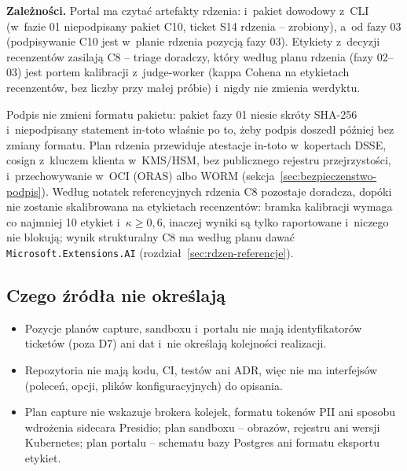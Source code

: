 \textbf{Zależności.} Portal ma czytać artefakty rdzenia:  i~pakiet
dowodowy z~CLI (w~fazie 01 niepodpisany pakiet C10, ticket S14 rdzenia -- zrobiony), a~od
fazy 03  (podpisywanie C10 jest w~planie rdzenia pozycją fazy 03).
Etykiety z~decyzji recenzentów zasilają C8 -- triage doradczy, który według planu rdzenia
(fazy 02--03) jest portem kalibracji z~judge-worker (kappa Cohena na etykietach recenzentów,
bez liczby przy małej próbie) i~nigdy nie zmienia werdyktu.

Podpis nie zmieni formatu pakietu: pakiet fazy 01 niesie skróty SHA-256 i~niepodpisany
statement in-toto właśnie po to, żeby podpis doszedł później bez zmiany formatu. Plan
rdzenia przewiduje atestacje in-toto w~kopertach DSSE, cosign z~kluczem klienta w~KMS/HSM,
bez publicznego rejestru przejrzystości, i~przechowywanie w~OCI (ORAS) albo WORM
(sekcja~\ref{sec:bezpieczenstwo-podpis}). Według notatek referencyjnych rdzenia C8 pozostaje
doradcza, dopóki nie zostanie skalibrowana na etykietach recenzentów: bramka kalibracji
wymaga co najmniej 10 etykiet i~$\kappa \geq 0{,}6$, inaczej wyniki są tylko raportowane
i~niczego nie blokują; wynik strukturalny C8 ma według planu dawać
\texttt{Microsoft.Extensions.AI} (rozdział~\ref{sec:rdzen-referencje}).


\subsection{Czego źródła nie określają}\label{sec:faza02-luki}

\begin{itemize}
  \item Pozycje planów capture, sandboxu i~portalu nie mają identyfikatorów ticketów (poza D7)
        ani dat i~nie określają kolejności realizacji.
  \item Repozytoria nie mają kodu, CI, testów ani ADR, więc nie ma interfejsów (poleceń, opcji,
        plików konfiguracyjnych) do opisania.
  \item Plan capture nie wskazuje brokera kolejek, formatu tokenów PII ani sposobu wdrożenia
        sidecara Presidio; plan sandboxu -- obrazów, rejestru ani wersji Kubernetes; plan
        portalu -- schematu bazy Postgres ani formatu eksportu etykiet.
\end{itemize}

